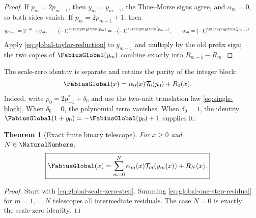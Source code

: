 \documentclass[11pt,oneside]{article}
\newtheorem{theorem}{Theorem}[section]
\theoremstyle{definition}
\theoremstyle{remark}
\begin{document}
\begin{proof}
If $p_m=2p_{m-1}$, then $y_m=y_{m-1}$, the Thue--Morse signs agree, and
$\alpha_m=0$, so both sides vanish.  If $p_m=2p_{m-1}+1$, then
\begin{equation*}
 y_{m-1}=2^{-m}+y_m,\qquad
 (-1)^{\BinaryDigitSum(p_m)}=-(-1)^{\BinaryDigitSum(p_{m-1})},\qquad
 \alpha_m=(-1)^{\BinaryDigitSum(p_{m-1})}.
\end{equation*}
Apply \eqref{eq:global-taylor-reduction} to $y_{m-1}$ and multiply by the old prefix sign;
the two copies of $\FabiusGlobal(y_m)$ combine exactly into $R_{m-1}-R_m$.
\end{proof}

The scale-zero identity is separate and retains the parity of the integer block:
\begin{equation}
 \FabiusGlobal(x)=\alpha_0(x)\mathcal T_0(y_0)+R_0(x).       \label{eq:global-scale-zero-step}
\end{equation}
Indeed, write $p_0=2p^*_{-1}+\delta_0$ and use the two-unit translation law
\eqref{eq:single-block}.  When $\delta_0=0$, the polynomial term vanishes.  When
$\delta_0=1$, the identity $\FabiusGlobal(1+y_0)=-\FabiusGlobal(y_0)+1$ supplies it.

\begin{theorem}[Exact finite binary telescope]
For $x\ge0$ and $N\in\NaturalNumbers$,
\begin{equation}
 \boxed{
 \FabiusGlobal(x)=
 \sum_{m=0}^{N}\alpha_m(x)\mathcal T_m(y_m(x))+R_N(x).}
                                                               \label{eq:global-finite-binary-telescope}
\end{equation}
\end{theorem}

\begin{proof}
Start with \eqref{eq:global-scale-zero-step}.  Summing
\eqref{eq:global-one-step-residual} for $m=1,\ldots,N$ telescopes all intermediate residuals.
The case $N=0$ is exactly the scale-zero identity.
\end{proof}
\end{document}
